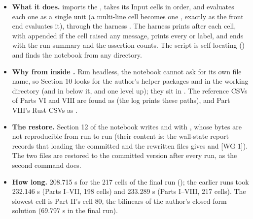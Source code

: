 \begin{itemize}
  \item \textbf{What it does.}  imports the , takes its Input cells in order, and evaluates each one as a single unit (a multi-line cell becomes one , exactly as the front end evaluates it), through the harness . The harness prints  after each cell, with  appended if the cell raised any message, prints every  or  label, and ends with the run summary and the assertion counts. The script is self-locating () and finds the notebook from any directory.
  \item \textbf{Why from inside .} Run headless, the notebook cannot ask for its own file name, so Section 10 looks for the author's helper packages  and  in the working directory (and in  below it, and one level up); they sit in . The reference CSVs of Parts VI and VIII are found as  (the log prints these paths), and Part VIII's Rust CSVs as .
  \item \textbf{The  restore.} Section 12 of the notebook writes  and  with , whose bytes are not reproducible from run to run (their content is: the wall-state report records that loading the committed and the rewritten files gives  and  [WG 1]). The two files are restored to the committed version after every run, as the second command does.
  \item \textbf{How long.} 208.715 s for the 217 cells of the final run (); the earlier runs took 232.146 s (Parts I--VII, 198 cells) and 233.289 s (Parts I--VIII, 217 cells). The slowest cell is Part II's cell 80, the bilinears of the author's closed-form solution (69.797 s in the final run).

\end{itemize}
